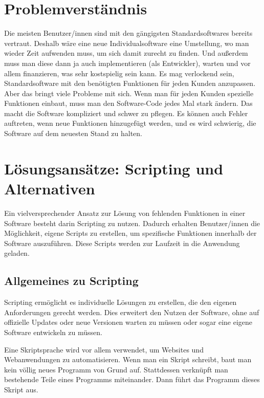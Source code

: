 \section{Problemverständnis}

Die meisten Benutzer/innen sind mit den gängigsten Standardsoftwares bereits vertraut. 
Deshalb wäre eine neue Individualsoftware eine Umstellung, wo man wieder Zeit aufwenden muss, 
um sich damit zurecht zu finden. Und außerdem muss man diese dann ja auch implementieren (als Entwickler), 
warten und vor allem finanzieren, was sehr kostspielig sein kann. 
\newline
Es mag verlockend sein, Standardsoftware mit den benötigten Funktionen für jeden Kunden anzupassen. 
Aber das bringt viele Probleme mit sich. Wenn man für jeden Kunden 
spezielle Funktionen einbaut, muss man den Software-Code jedes Mal stark ändern. 
Das macht die Software kompliziert und schwer zu pflegen. Es können auch Fehler auftreten, 
wenn neue Funktionen hinzugefügt werden, und es wird schwierig, die Software auf dem 
neuesten Stand zu halten.

\newpage
\section{Lösungsansätze: Scripting und Alternativen}

Ein vielversprechender Ansatz zur Lösung von fehlenden Funktionen in einer Software besteht darin 
Scripting zu nutzen. Dadurch erhalten Benutzer/innen die Möglichkeit, eigene Scripts zu erstellen, 
um spezifische Funktionen innerhalb der Software auszuführen. Diese Scripts werden 
zur Laufzeit in die Anwendung geladen.

\subsection*{Allgemeines zu Scripting}

Scripting ermöglicht es individuelle Lösungen zu erstellen, 
die den eigenen Anforderungen gerecht werden. 
Dies erweitert den Nutzen der Software, ohne auf offizielle Updates oder neue Versionen 
warten zu müssen oder sogar eine eigene Software entwickeln zu müssen.

Eine Skriptsprache wird vor allem verwendet, um Websites und Webanwendungen zu automatisieren. 
Wenn man ein Skript schreibt, baut man kein völlig neues Programm von Grund auf. 
Stattdessen verknüpft man bestehende Teile eines Programms miteinander. 
Dann führt das Programm dieses Skript aus.

